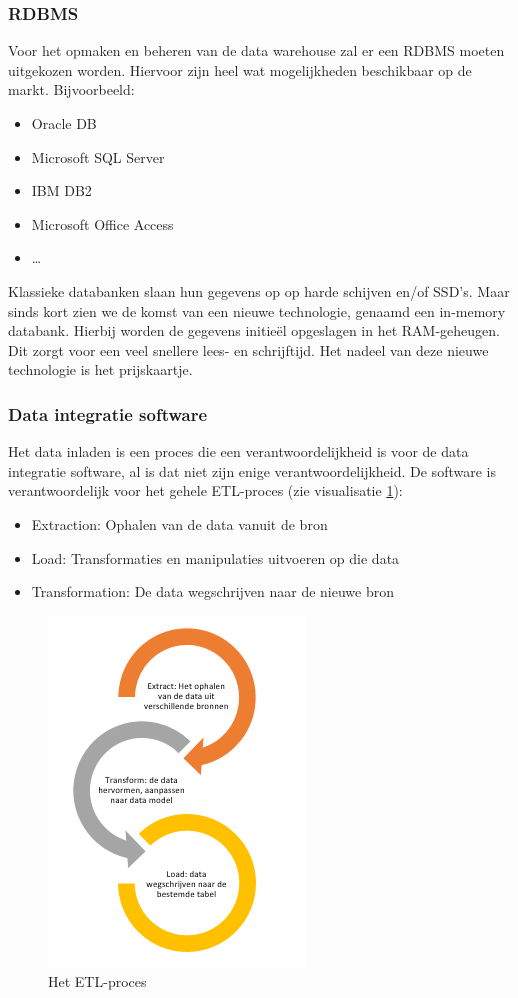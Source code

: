 \subsubsection{RDBMS}
Voor het opmaken en beheren van de data warehouse zal er een RDBMS moeten uitgekozen worden. Hiervoor zijn heel wat mogelijkheden beschikbaar op de markt. Bijvoorbeeld: 

\begin{itemize}
	\item Oracle DB
	\item Microsoft SQL Server
	\item IBM DB2
	\item Microsoft Office Access
	\item \ldots
\end{itemize} 

Klassieke databanken slaan hun gegevens op op harde schijven en/of SSD's. Maar sinds kort zien we de komst van een nieuwe technologie, genaamd een in-memory databank. Hierbij worden de gegevens initieël opgeslagen in het RAM-geheugen. Dit zorgt voor een veel snellere lees- en schrijftijd. Het nadeel van deze nieuwe technologie is het prijskaartje.

\subsubsection{Data integratie software}
\label{sec:etl}
Het data inladen is een proces die een verantwoordelijkheid is voor de data integratie software, al is dat niet zijn enige verantwoordelijkheid. De software is verantwoordelijk voor het gehele ETL-proces (zie visualisatie \ref{fig:etl}):

\begin{itemize}
	\item Extraction: Ophalen van de data vanuit de bron
	\item Load: Transformaties en manipulaties uitvoeren op die data
	\item Transformation: De data wegschrijven naar de nieuwe bron
\end{itemize} 

\begin{figure}[h]
	\centering
	\includegraphics[scale=1]{../images/ETL.PNG}
	\caption{Het ETL-proces}
	\label{fig:etl}
\end{figure}


